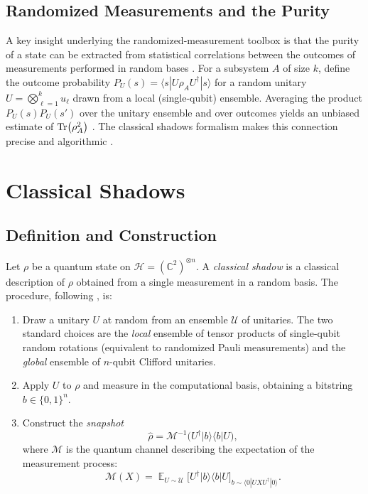 \documentclass[12pt,a4paper,oneside]{book}
\theoremstyle{plain}
\theoremstyle{definition}
\theoremstyle{remark}
\DeclareMathOperator{\E}{\mathbb{E}}
\begin{document}
\subsection{Randomized Measurements and the Purity}

A key insight underlying the randomized-measurement toolbox \cite{elben2023toolbox} is that the purity of a state can be extracted from statistical correlations between the outcomes of measurements performed in random bases \cite{vanenk2012measuring, vermersch2018statistical}. For a subsystem $A$ of size $k$, define the outcome probability $P_U(s) = \langle s| U \rho_A U^\dagger |s \rangle$ for a random unitary $U = \bigotimes_{\ell=1}^{k} u_\ell$ drawn from a local (single-qubit) ensemble. Averaging the product $P_U(s) P_U(s')$ over the unitary ensemble and over outcomes yields an unbiased estimate of $\Tr(\rho_A^2)$ \cite{brydges2019probing}. The classical shadows formalism makes this connection precise and algorithmic \cite{huang2020predicting}.

\section{Classical Shadows}
\label{sec:shadows}

\subsection{Definition and Construction}

Let $\rho$ be a quantum state on $\mathcal{H} = (\mathbb{C}^2)^{\otimes n}$. A \emph{classical shadow} is a classical description of $\rho$ obtained from a single measurement in a random basis. The procedure, following \cite{huang2020predicting}, is:

\begin{enumerate}
    \item Draw a unitary $U$ at random from an ensemble $\mathcal{U}$ of unitaries. The two standard choices are the \emph{local} ensemble of tensor products of single-qubit random rotations (equivalent to randomized Pauli measurements) and the \emph{global} ensemble of $n$-qubit Clifford unitaries.
    \item Apply $U$ to $\rho$ and measure in the computational basis, obtaining a bitstring $b \in \{0,1\}^n$.
    \item Construct the \emph{snapshot}
    \begin{equation}
        \label{eq:snapshot}
        \hat{\rho} = \mathcal{M}^{-1}\bigl(U^\dagger |b\rangle\langle b| U\bigr),
    \end{equation}
    where $\mathcal{M}$ is the quantum channel describing the expectation of the measurement process:
    \begin{equation}
        \mathcal{M}(X) = \E_{U \sim \mathcal{U}}\bigl[ U^\dagger |b\rangle\langle b| U \bigr]_{b \sim \langle 0|U X U^\dagger|0\rangle}.
    \end{equation}
\end{enumerate}
\end{document}
